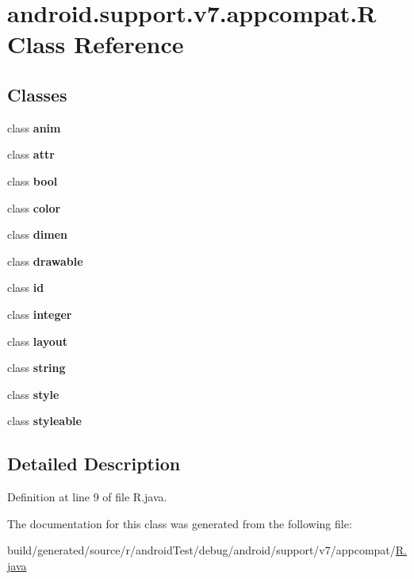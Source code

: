 \hypertarget{classandroid_1_1support_1_1v7_1_1appcompat_1_1_r}{}\section{android.\+support.\+v7.\+appcompat.\+R Class Reference}
\label{classandroid_1_1support_1_1v7_1_1appcompat_1_1_r}
\subsection*{Classes}
\begin{DoxyCompactItemize}
\item 
class {\bfseries anim}
\item 
class {\bfseries attr}
\item 
class {\bfseries bool}
\item 
class {\bfseries color}
\item 
class {\bfseries dimen}
\item 
class {\bfseries drawable}
\item 
class {\bfseries id}
\item 
class {\bfseries integer}
\item 
class {\bfseries layout}
\item 
class {\bfseries string}
\item 
class {\bfseries style}
\item 
class {\bfseries styleable}
\end{DoxyCompactItemize}


\subsection{Detailed Description}


Definition at line 9 of file R.\+java.



The documentation for this class was generated from the following file\+:\begin{DoxyCompactItemize}
\item 
build/generated/source/r/android\+Test/debug/android/support/v7/appcompat/\hyperlink{android_test_2debug_2android_2support_2v7_2appcompat_2_r_8java}{R.\+java}\end{DoxyCompactItemize}
